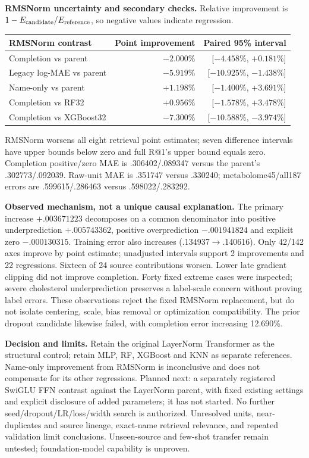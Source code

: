 \documentclass[10pt,a4paper]{article}
\newcommand{\sub}[1]{\textbf{#1}\enspace}
\newcommand{\smalltable}{\fontsize{8.7}{10.4}\selectfont}
\begin{document}
\sub{RMSNorm uncertainty and secondary checks.}
Relative improvement is $1-E_{\rm candidate}/E_{\rm reference}$, so negative values indicate regression.
\begin{center}\smalltable
\begin{tabular}{@{}lrr@{}}\toprule
RMSNorm contrast & Point improvement & Paired 95\% interval\\\midrule
Completion vs parent & $-2.000\%$ & [$-4.458\%$, $+0.181\%$]\\
Legacy log-MAE vs parent & $-5.919\%$ & [$-10.925\%$, $-1.438\%$]\\
Name-only vs parent & $+1.198\%$ & [$-1.400\%$, $+3.691\%$]\\
Completion vs RF32 & $+0.956\%$ & [$-1.578\%$, $+3.478\%$]\\
Completion vs XGBoost32 & $-7.300\%$ & [$-10.588\%$, $-3.974\%$]\\\bottomrule
\end{tabular}
\end{center}
RMSNorm worsens all eight retrieval point estimates; seven difference intervals have upper bounds below zero and full R@1's upper bound equals zero. Completion positive/zero MAE is .306402/.089347 versus the parent's .302773/.092039. Raw-unit MAE is .351747 versus .330240; metabolome45/all187 errors are .599615/.286463 versus .598022/.283292.

\sub{Observed mechanism, not a unique causal explanation.}
The primary increase $+.003671223$ decomposes on a common denominator into positive underprediction $+.005743362$, positive overprediction $-.001941824$ and explicit zero $-.000130315$. Training error also increases (.134937$\to$.140616). Only 42/142 axes improve by point estimate; unadjusted intervals support 2 improvements and 22 regressions. Sixteen of 24 source contributions worsen. Lower late gradient clipping did not improve completion. Forty fixed extreme cases were inspected; severe cholesterol underprediction preserves a label-scale concern without proving label errors. These observations reject the fixed RMSNorm replacement, but do not isolate centering, scale, bias removal or optimization compatibility. The prior dropout candidate likewise failed, with completion error increasing 12.690\%.

\sub{Decision and limits.}
Retain the original LayerNorm Transformer as the structural control; retain MLP, RF, XGBoost and KNN as separate references. Name-only improvement from RMSNorm is inconclusive and does not compensate for its other regressions. Planned next: a separately registered SwiGLU FFN contrast against the LayerNorm parent, with fixed existing settings and explicit disclosure of added parameters; it has not started. No further seed/dropout/LR/loss/width search is authorized. Unresolved units, near-duplicates and source lineage, exact-name retrieval relevance, and repeated validation limit conclusions. Unseen-source and few-shot transfer remain untested; foundation-model capability is unproven.
\end{document}
